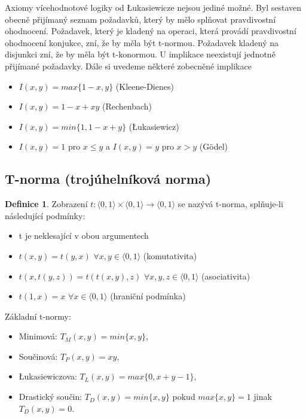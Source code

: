 \documentclass[a4]{report}
\theoremstyle{definition}
\newtheorem{definition}{Definice}[section]
\begin{document}
Axiomy vícehodnotové logiky od Łukasiewicze nejsou jediné možné. Byl sestaven obecně přijímaný seznam požadavků, který by mělo splňovat pravdivostní ohodnocení. Požadavek, který je kladený na operaci, která provádí pravdivostní ohodnocení konjukce, zní, že by měla být t-normou. Požadavek kladený na disjunkci zní, že by měla být t-konormou. U implikace neexistují jednotně přijímané požadavky. Dále si uvedeme některé zobecněné implikace

\begin{itemize}
\item $I(x,y)=max\{1-x,y \}$ (Kleene-Dienes)
\item  $I(x,y)=1-x+xy$  (Rechenbach)
\item  $I(x,y)=min\{1,1-x+y\}$  (Łukasiewicz)
\item  $I(x,y)=1$ pro $x\leq y$ a $I(x,y)=y$ pro $x>y$  (Gödel)
\end{itemize}


\subsection{T-norma (trojúhelníková norma)}

\begin{definition}
Zobrazení $t:\langle 0,1\rangle \times \langle 0,1\rangle \rightarrow \langle 0,1\rangle$ se nazývá t-norma, splňuje-li následující podmínky:

\begin{itemize}
\item  t je neklesající v obou argumentech
\item  $t(x,y)=t(y,x)$  $\forall x,y\in \langle 0,1 \rangle$ (komutativita)
\item  $t(x,t(y,z))=t(t(x,y),z) $  $\forall x,y,z\in \langle 0,1 \rangle$ (asociativita)
\item $t(1,x)=x$  $\forall x\in \langle 0,1 \rangle$ (hraniční podmínka)
\end{itemize}
\end{definition}

Základní t-normy:
\begin{itemize}
\item Minimová: $T_M (x,y)=min\{x,y\}$,
\item Součinová: $T_P (x,y)=xy$,
\item Łukasiewiczova: $T_L (x,y)=max\{0,x+y-1\}$,
\item Drastický součin: $T_D(x,y)=min\{x,y\}$ pokud $max\{x,y\}=1$ jinak $T_D(x,y)=0$.
\end{itemize}
\end{document}
